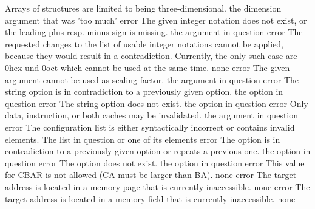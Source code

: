 \documentclass[12pt,twoside]{report}
\begin{document}
\begin{description}
               {Arrays of structures are limited to being three-dimensional.}
               {the dimension argument that was 'too much'}
               {error}
               {The given integer notation does not exist, or the leading plus resp.
                minus sign is missing.}
               {the argument in question}
               {error}
               {The requested changes to the list of usable integer notations cannot
                be applied, because they would result in a contradiction.  Currently,
                the only such case are 0hex und 0oct which cannot be used at the same
                time.}
               {none}
               {error}
               {The given argument cannot be used as scaling factor.}
               {the argument in question}
               {error}
               {The string option is in contradiction to a previously given option.}
               {the option in question}
               {error}
               {The string option does not exist.}
               {the option in question}
               {error}
               {Only data, instruction, or both caches may be invalidated.}
               {the argument in question}
               {error}
               {The configuration list is either syntactically incorrect or
                contains invalid elements.}
               {The list in question or one of its elements}
               {error}
               {The option is in contradiction to a previously given option or repeats a previous one.}
               {the option in question}
               {error}
               {The option does not exist.}
               {the option in question}
               {error}
               {This value for CBAR is not allowed (CA must be larger than BA).}
               {none}
               {error}
               {The target address is located in a memory page that is currently
                inaccessible.}
               {none}
               {error}
               {The target address is located in a memory field that is currently
                inaccessible.}
               {none}

\end{description}
\end{document}
